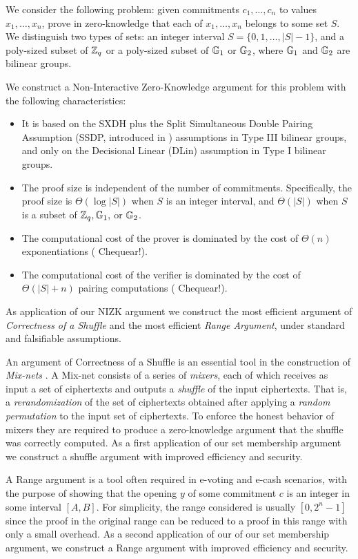 We consider the following problem: given commitments $c_1,\ldots,c_n$ to values $x_1,\ldots,x_n$, prove in zero-knowledge that each of $x_1,\ldots,x_n$ belongs to some set $S$. We distinguish two types of sets: an integer interval $S=\{0,1,\ldots,|S|-1\}$, and a poly-sized subset of $\mathbb{Z}_q$ or a poly-sized subset of $\mathbb{G}_1$ or $\mathbb{G}_2$, where $\mathbb{G}_1$ and $\mathbb{G}_2$ are bilinear groups.
  
We construct a Non-Interactive Zero-Knowledge argument for this problem with the following characteristics:
\begin{itemize}
\item It is based on the SXDH plus the Split Simultaneous Double Pairing Assumption  (SSDP, introduced in \cite{AC:GonHevRaf15}) assumptions in Type III bilinear groups, and only on the Decisional Linear (DLin) assumption in Type I bilinear groups.
\item The proof size is independent of the number of commitments. Specifically, the proof size is $\Theta(\log|S|)$ when $S$ is an integer interval, and $\Theta(|S|)$ when $S$ is a subset of $\mathbb{Z}_q,\mathbb{G}_1,$ or $\mathbb{G}_2$.
\item The computational cost of the prover is dominated by the cost of $\Theta(n)$ exponentiations ({\color{red} Chequear!}).
\item The computational cost of the verifier is dominated by the cost of $\Theta(|S|+n)$ pairing computations ({\color{red} Chequear!}). 
\end{itemize}

As application of our NIZK argument we construct the most efficient argument of \emph{Correctness of a Shuffle} and the most efficient \emph{Range Argument}, under standard and falsifiable assumptions.

An argument of Correctness of a Shuffle is an essential tool in the construction of \emph{Mix-nets} \cite{Chaum81}. A Mix-net consists of a series of \emph{mixers}, each of which receives as input a set of ciphertexts and  outputs a \emph{shuffle} of the input ciphertexts. That is, a \emph{rerandomization} of the set of ciphertexts obtained after applying a \emph{random permutation} to the input set of ciphertexts. To enforce the honest behavior of mixers they are required to produce a zero-knowledge argument that the shuffle was correctly computed. As a first application of our set membership argument we construct a shuffle argument with improved efficiency and security.

A Range argument is a tool often required in e-voting and e-cash scenarios, with the purpose of showing that the opening $y$ of some commitment $c$ is an integer in some interval $[A,B]$. For simplicity, the range considered is usually $[0,2^n-1]$ since the proof in the original range can be reduced to a proof in this range with only a small overhead. As a second application of our of our set membership argument, we construct a Range argument with improved efficiency and security.

